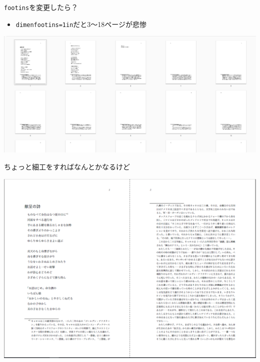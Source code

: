 \documentclass[14pt,dvipdfmx,uplatex]{beamer}
\begin{document}
\begin{frame}[t]{\inhibitglue \texttt{\bslash footins}を変更したら？}
  \sffamily
  \begin{itemize}
    \item \texttt{\bslash dimen\bslash footins=1in}だと3～18ページが悲惨
  \end{itemize}
  \begin{center}
    \includegraphics[width=\textwidth]{footins-one-inch-1.png}
  \end{center}
\end{frame}

\begin{frame}[t]{\inhibitglue ちょっと細工をすればなんとかなるけど}
  \sffamily
  \begin{center}
    \includegraphics[width=.9\textwidth]{alice-annotated-pagebreak-0.png}
  \end{center}
\end{frame}
\end{document}
